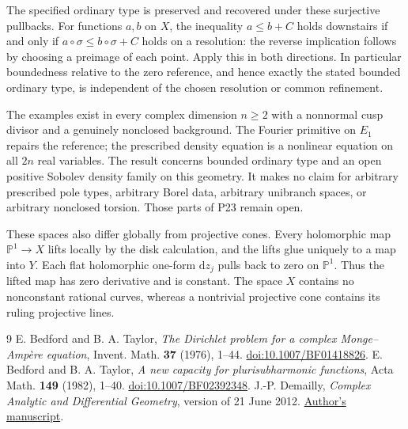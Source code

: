 \documentclass[11pt]{article}
\begin{document}
The specified ordinary type is preserved and recovered under these
surjective pullbacks. For functions $a,b$ on $X$, the inequality
$a\le b+C$ holds downstairs if and only if
$a\circ\sigma\le b\circ\sigma+C$ holds on a resolution: the reverse
implication follows by choosing a preimage of each point. Apply this
in both directions. In particular boundedness relative to the zero
reference, and hence exactly the stated bounded ordinary type, is
independent of the chosen resolution or common refinement.

The examples exist in every complex dimension $n\ge2$ with a nonnormal cusp
divisor and a genuinely nonclosed background. The Fourier primitive on
$E_1$ repairs the reference; the prescribed density equation is a nonlinear
equation on all $2n$ real variables. The result concerns bounded ordinary
type and an open positive Sobolev density family on this geometry. It makes
no claim for arbitrary prescribed pole types, arbitrary Borel data, arbitrary
unibranch spaces, or arbitrary nonclosed torsion. Those parts of P23 remain open.

These spaces also differ globally from projective cones. Every holomorphic
map $\mathbb P^1\to X$ lifts locally by the disk calculation, and the lifts
glue uniquely to a map into $Y$. Each flat holomorphic one-form
$\mathrm{d}z_j$ pulls back to zero on $\mathbb P^1$. Thus the lifted map
has zero derivative and is constant. The space $X$ contains no nonconstant
rational curves, whereas a nontrivial projective cone contains its ruling
projective lines.

\begin{thebibliography}{9}
 E. Bedford and B. A. Taylor,
\emph{The Dirichlet problem for a complex Monge--Amp\`ere equation},
Invent. Math. \textbf{37} (1976), 1--44.
\href{https://doi.org/10.1007/BF01418826}{doi:10.1007/BF01418826}.
 E. Bedford and B. A. Taylor,
\emph{A new capacity for plurisubharmonic functions},
Acta Math. \textbf{149} (1982), 1--40.
\href{https://doi.org/10.1007/BF02392348}{doi:10.1007/BF02392348}.
 J.-P. Demailly,
\emph{Complex Analytic and Differential Geometry}, version of 21 June 2012.
\href{https://www-fourier.univ-grenoble-alpes.fr/~demailly/manuscripts/agbook.pdf}{Author's manuscript}.
\end{thebibliography}
\end{document}
